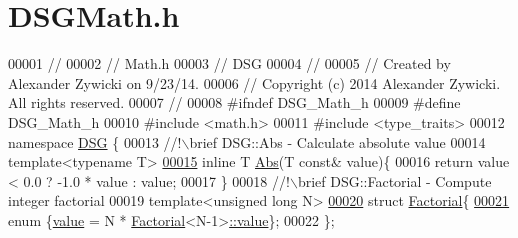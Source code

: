 \hypertarget{_d_s_g_math_8h_source}{\section{D\+S\+G\+Math.\+h}
\label{_d_s_g_math_8h_source}
}

\begin{DoxyCode}
00001 \textcolor{comment}{//}
00002 \textcolor{comment}{//  Math.h}
00003 \textcolor{comment}{//  DSG}
00004 \textcolor{comment}{//}
00005 \textcolor{comment}{//  Created by Alexander Zywicki on 9/23/14.}
00006 \textcolor{comment}{//  Copyright (c) 2014 Alexander Zywicki. All rights reserved.}
00007 \textcolor{comment}{//}
00008 \textcolor{preprocessor}{#ifndef DSG\_Math\_h}
00009 \textcolor{preprocessor}{#define DSG\_Math\_h}
00010 \textcolor{preprocessor}{#include <math.h>}
00011 \textcolor{preprocessor}{#include <type\_traits>}
00012 \textcolor{keyword}{namespace }\hyperlink{namespace_d_s_g}{DSG} \{\textcolor{comment}{}
00013 \textcolor{comment}{    //!\(\backslash\)brief DSG::Abs - Calculate absolute value}
00014 \textcolor{comment}{}    \textcolor{keyword}{template}<\textcolor{keyword}{typename} T>
\hypertarget{_d_s_g_math_8h_source_l00015}{}\hyperlink{namespace_d_s_g_a0af03bade7e25e8da80e3022af0e45a7}{00015}     \textcolor{keyword}{inline} T \hyperlink{namespace_d_s_g_a0af03bade7e25e8da80e3022af0e45a7}{Abs}(T \textcolor{keyword}{const}& value)\{
00016         \textcolor{keywordflow}{return} value < 0.0 ? -1.0 * value : value;
00017     \}\textcolor{comment}{}
00018 \textcolor{comment}{    //!\(\backslash\)brief DSG::Factorial - Compute integer factorial}
00019 \textcolor{comment}{}    \textcolor{keyword}{template}<\textcolor{keywordtype}{unsigned} \textcolor{keywordtype}{long} N>
\hypertarget{_d_s_g_math_8h_source_l00020}{}\hyperlink{struct_d_s_g_1_1_factorial}{00020}     \textcolor{keyword}{struct }\hyperlink{struct_d_s_g_1_1_factorial}{Factorial}\{
\hypertarget{_d_s_g_math_8h_source_l00021}{}\hyperlink{struct_d_s_g_1_1_factorial_a2443a477420ba8fc5494b186a58dcaccaebc078d57d6fc1fbd5953d284c9cde04}{00021}         \textcolor{keyword}{enum} \{\hyperlink{struct_d_s_g_1_1_factorial_a2443a477420ba8fc5494b186a58dcaccaebc078d57d6fc1fbd5953d284c9cde04}{value} = N * \hyperlink{struct_d_s_g_1_1_factorial}{Factorial}<N-1>\hyperlink{struct_d_s_g_1_1_factorial_a2443a477420ba8fc5494b186a58dcaccaebc078d57d6fc1fbd5953d284c9cde04}{::value}\};
00022     \};\textcolor{comment}{}

\end{DoxyCode}
